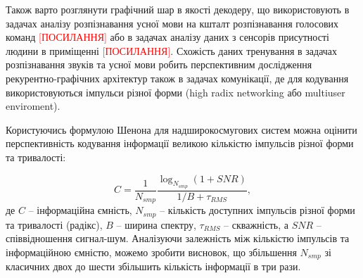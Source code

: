 Також варто розглянути графічний шар в якості декодеру, що використовують в
задачах аналізу розпізнавання усної мови на кшталт розпізнавання голосових 
команд \textcolor{red}{[ПОСИЛАННЯ]} або в задачах аналізу даних з сенсорів
присутності людини в приміщенні \textcolor{red}{[ПОСИЛАННЯ]}. Схожість даних
тренування в задачах розпізнавання звуків та усної мови робить перспективним
дослідження рекурентно-графічних архітектур також в задачах комунікації, де 
для кодування використовуються імпульси різної форми (high radix networking
або multiuser enviroment).

Користуючись формулою Шенона для надширокосмугових систем 
\cite{imp:ChannelLimitations} можна оцінити перспективність кодування 
інформації великою кількістю імпульсів різної форми та тривалості:

\begin{equation}
C = \frac{1}{N_{smp}} 
\frac{\log_{N_{smp}} \left( 1 + SNR \right)}{1/B + \tau_{RMS}},
\end{equation}
%
де $ C $ -- інформаційна ємність, $ N_{smp} $ -- кількість доступних 
імпульсів різної форми та тривалості (радікс), $ B $ -- ширина спектру, 
$ \tau_{RMS} $ -- скважність, а $ SNR $ -- співвідношення сигнал-шум.
Аналізуючи залежність між кількістю імпульсів та інформаційною ємністю, 
можемо зробити висновок, що збільшення $ N_{smp} $ зі класичних двох до 
шести збільшить кількість інформації в три рази.




